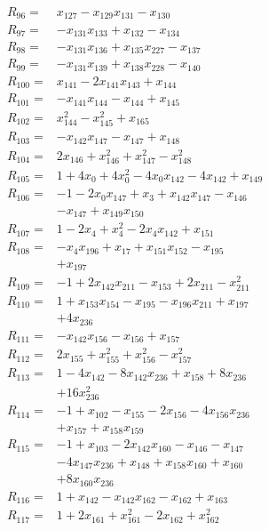 \begin{align*}
R_{96}={}&x_{127} -x_{129}x_{131} -x_{130}\\[3pt]
R_{97}={}&-x_{131}x_{133} +x_{132} -x_{134}\\[3pt]
R_{98}={}&-x_{131}x_{136} +x_{135}x_{227} -x_{137}\\[3pt]
R_{99}={}&-x_{131}x_{139} +x_{138}x_{228} -x_{140}\\[3pt]
R_{100}={}&x_{141} -2x_{141}x_{143} +x_{144}\\[3pt]
R_{101}={}&-x_{141}x_{144} -x_{144} +x_{145}\\[3pt]
R_{102}={}&x_{144}^{2} -x_{145}^{2} +x_{165}\\[3pt]
R_{103}={}&-x_{142}x_{147} -x_{147} +x_{148}\\[3pt]
R_{104}={}&2x_{146} +x_{146}^{2} +x_{147}^{2} -x_{148}^{2}\\[3pt]
R_{105}={}&1 +4x_{0} +4x_{0}^{2} -4x_{0}x_{142} -4x_{142} +x_{149}\\[3pt]
R_{106}={}&-1 -2x_{0}x_{147} +x_{3} +x_{142}x_{147} -x_{146}\\
&-x_{147} +x_{149}x_{150}\\[3pt]
R_{107}={}&1 -2x_{4} +x_{4}^{2} -2x_{4}x_{142} +x_{151}\\[3pt]
R_{108}={}&-x_{4}x_{196} +x_{17} +x_{151}x_{152} -x_{195}\\
&+x_{197}\\[3pt]
R_{109}={}&-1 +2x_{142}x_{211} -x_{153} +2x_{211} -x_{211}^{2}\\[3pt]
R_{110}={}&1 +x_{153}x_{154} -x_{195} -x_{196}x_{211} +x_{197}\\
&+4x_{236}\\[3pt]
R_{111}={}&-x_{142}x_{156} -x_{156} +x_{157}\\[3pt]
R_{112}={}&2x_{155} +x_{155}^{2} +x_{156}^{2} -x_{157}^{2}\\[3pt]
R_{113}={}&1 -4x_{142} -8x_{142}x_{236} +x_{158} +8x_{236}\\
&+16x_{236}^{2}\\[3pt]
R_{114}={}&-1 +x_{102} -x_{155} -2x_{156} -4x_{156}x_{236}\\
&+x_{157} +x_{158}x_{159}\\[3pt]
R_{115}={}&-1 +x_{103} -2x_{142}x_{160} -x_{146} -x_{147}\\
&-4x_{147}x_{236} +x_{148} +x_{158}x_{160} +x_{160}\\
&+8x_{160}x_{236}\\[3pt]
R_{116}={}&1 +x_{142} -x_{142}x_{162} -x_{162} +x_{163}\\[3pt]
R_{117}={}&1 +2x_{161} +x_{161}^{2} -2x_{162} +x_{162}^{2}\\

\end{align*}
